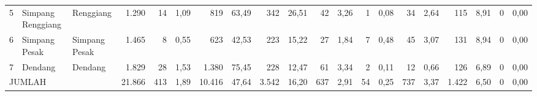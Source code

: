 \begin{small}
\begin{tabular}{rllrrrrrrrrrrrrrrrrr}
	5 & Simpang Renggiang & Renggiang     &  1.290 &  14 & 1,09 &    819 & 63,49 &   342 & 26,51 &  42 & 3,26 &  1 & 0,08 &  34 & 2,64 &   115 & 8,91 & 0 & 0,00 \\
	6 & Simpang Pesak     & Simpang Pesak &  1.465 &   8 & 0,55 &    623 & 42,53 &   223 & 15,22 &  27 & 1,84 &  7 & 0,48 &  45 & 3,07 &   131 & 8,94 & 0 & 0,00 \\
	7 & Dendang           & Dendang       &  1.829 &  28 & 1,53 &  1.380 & 75,45 &   228 & 12,47 &  61 & 3,34 &  2 & 0,11 &  12 & 0,66 &   126 & 6,89 & 0 & 0,00 \\
    \midrule
    \multicolumn{3}{l}{JUMLAH}            & 21.866 & 413 & 1,89 & 10.416 & 47,64 & 3.542 & 16,20 & 637 & 2,91 & 54 & 0,25 & 737 & 3,37 & 1.422 & 6,50 & 0 & 0,00 \\
    \bottomrule
\end{tabular}%
\end{small} 



